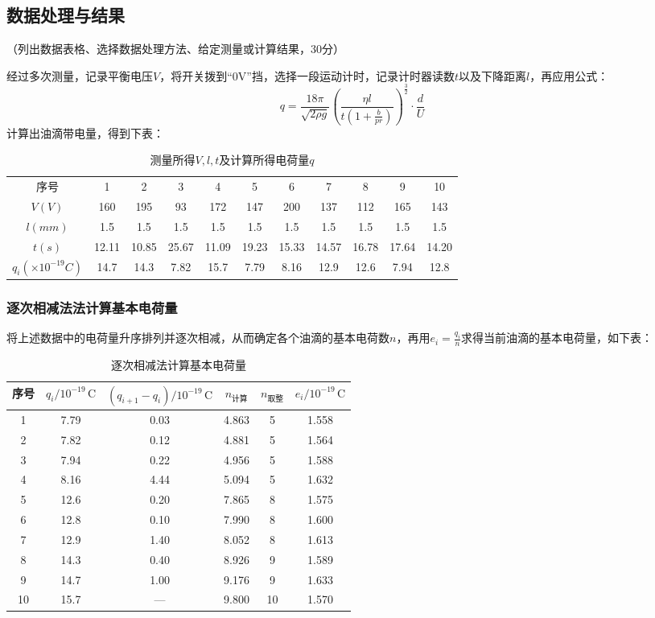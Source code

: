 \documentclass[10pt,a4paper]{ctexart}
\newcommand{\xiaosi}{\fontsize{12pt}{16pt}\selectfont}
\begin{document}
    \subsection{数据处理与结果}
    \xiaosi （列出数据表格、选择数据处理方法、给定测量或计算结果，30分）

    经过多次测量，记录平衡电压$V$，将开关拨到“0V”挡，选择一段运动计时，记录计时器读数$t$以及下降距离$l$，再应用公式：
\[ q = \frac{18\pi}{\sqrt{2\rho g}} \left( \frac{\eta l}{t\left(1 + \frac{b}{pr}\right)} \right)^{\frac{3}{2}} \cdot \frac{d}{U} \]
计算出油滴带电量，得到下表：
\begin{table}[H]
  \centering
  \caption{测量所得$V,l,t$及计算所得电荷量$q$}
  \begin{tabular}{@{}ccccccccccc@{}}
    序号 & 1 & 2 & 3 & 4 & 5 & 6 & 7 & 8 & 9 & 10 \\
    \( V(V) \) & 160 & 195 & 93 & 172 & 147 & 200 & 137 & 112 & 165 & 143 \\
    \( l(mm) \) & 1.5 & 1.5 & 1.5 & 1.5 & 1.5 & 1.5 & 1.5 & 1.5 & 1.5 & 1.5 \\
    \( t(s) \) & 12.11 & 10.85 & 25.67 & 11.09 & 19.23 & 15.33 & 14.57 & 16.78 & 17.64 & 14.20 \\
    \( q_i(\times10^{-19}C) \) & 14.7 & 14.3 & 7.82 & 15.7 & 7.79 & 8.16 & 12.9 & 12.6 & 7.94 & 12.8 \\
  \end{tabular}
\end{table}

\subsubsection{逐次相减法法计算基本电荷量}
将上述数据中的电荷量升序排列并逐次相减，从而确定各个油滴的基本电荷数$n$，再用$e_i=\frac{q_i}{n}$求得当前油滴的基本电荷量，如下表：
\begin{table}[H]
  \centering
  \caption{逐次相减法计算基本电荷量}
  \begin{tabular}{@{\hspace{1em}}cccccc@{\hspace{1em}}}
    序号 & \( q_i/10^{-19}\,\text{C} \) & \( (q_{i+1}-q_i)/10^{-19}\,\text{C} \) & \( n_{\text{计算}} \) & \( n_{\text{取整}} \) & \( e_i/10^{-19}\,\text{C} \) \\
    \hline
    1 & 7.79 & 0.03 & 4.863 & 5 & 1.558 \\
    2 & 7.82 & 0.12 & 4.881 & 5 & 1.564 \\
    3 & 7.94 & 0.22 & 4.956 & 5 & 1.588 \\
    4 & 8.16 & 4.44 & 5.094 & 5 & 1.632 \\
    5 & 12.6 & 0.20 & 7.865 & 8 & 1.575 \\
    6 & 12.8 & 0.10 & 7.990 & 8 & 1.600 \\
    7 & 12.9 & 1.40 & 8.052 & 8 & 1.613 \\
    8 & 14.3 & 0.40 & 8.926 & 9 & 1.589 \\
    9 & 14.7 & 1.00 & 9.176 & 9 & 1.633 \\
    10 & 15.7 & — & 9.800 & 10 & 1.570 \\
  \end{tabular}
\end{table}
\end{document}
